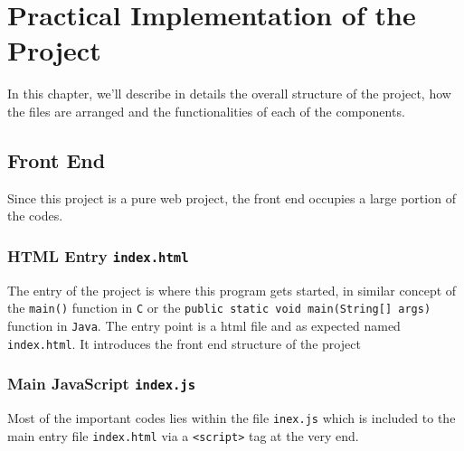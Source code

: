
\chapter{Practical Implementation of the Project} %

\label{Chapter4} %

In this chapter, we'll describe in details the overall structure of the project, how the files are arranged and the functionalities of each of the components.


\section{Front End}

Since this project is a pure web project, the front end occupies a large portion of the codes.

\subsection{HTML Entry \texttt{index.html}}

The entry of the project is where this program gets started, in similar concept of the \texttt{main()} function in \texttt{C} or the \texttt{public static void main(String[] args)} function in \texttt{Java}. The entry point is a \gls{html} file and as expected named \texttt{index.html}. It introduces the front end structure of the project


\subsection{Main JavaScript \texttt{index.js}}

Most of the important codes lies within the file \texttt{inex.js} which is included to the main entry file \texttt{index.html} via a \texttt{<script>} tag at the very end.


